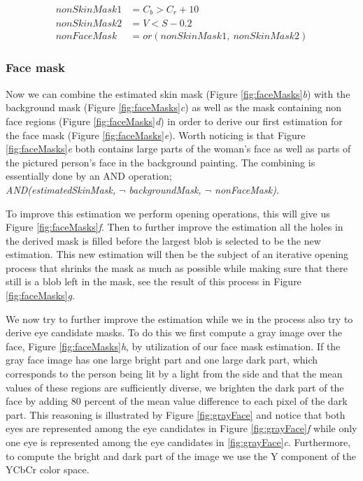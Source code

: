 \begin{equation} \label{eq:nonFaceMask}
\begin{split}
  nonSkinMask1 & = C_{b} > C_{r} + 10 \\
  nonSkinMask2 & = V < S - 0.2 \\
  nonFaceMask & = or(nonSkinMask1, \ nonSkinMask2)
\end{split}
\end{equation}

\subsubsection{Face mask}
Now we can combine the estimated skin mask (Figure \ref{fig:faceMasks}\textit{b}) with the background mask (Figure \ref{fig:faceMasks}\textit{c}) as well as the mask containing non face regions (Figure \ref{fig:faceMasks}\textit{d}) in order to derive our first estimation for the face mask (Figure \ref{fig:faceMasks}\textit{e}). Worth noticing is that Figure \ref{fig:faceMasks}\textit{e} both contains large parts of the woman's face as well as parts of the pictured person's face in the background painting. The combining is essentially done by an AND operation; \\ 
\-\hspace{1.0cm} \textit{AND(estimatedSkinMask, $\neg$ backgroundMask, $\neg$ nonFaceMask)}.

To improve this estimation we perform opening operations, this will give us Figure \ref{fig:faceMasks}\textit{f}. Then to further improve the estimation all the holes in the derived mask is filled before the largest blob is selected to be the new estimation. This new estimation will then be the subject of an iterative opening process that shrinks the mask as much as possible while making sure that there still is a blob left in the mask, see the result of this process in Figure \ref{fig:faceMasks}\textit{g}.

We now try to further improve the estimation while we in the process also try to derive eye candidate masks. To do this we first compute a gray image over the face, Figure \ref{fig:faceMasks}\textit{h}, by utilization of our face mask estimation. If the gray face image has one large bright part and one large dark part, which corresponds to the person being lit by a light from the side and that the mean values of these regions are sufficiently diverse, we brighten the dark part of the face by adding $80$ percent of the mean value difference to each pixel of the dark part. This reasoning is illustrated by Figure \ref{fig:grayFace} and notice that both eyes are represented among the eye candidates in Figure \ref{fig:grayFace}\textit{f} while only one eye is represented among the eye candidates in \ref{fig:grayFace}\textit{c}. Furthermore, to compute the bright and dark part of the image we use the Y component of the YCbCr color space. 

